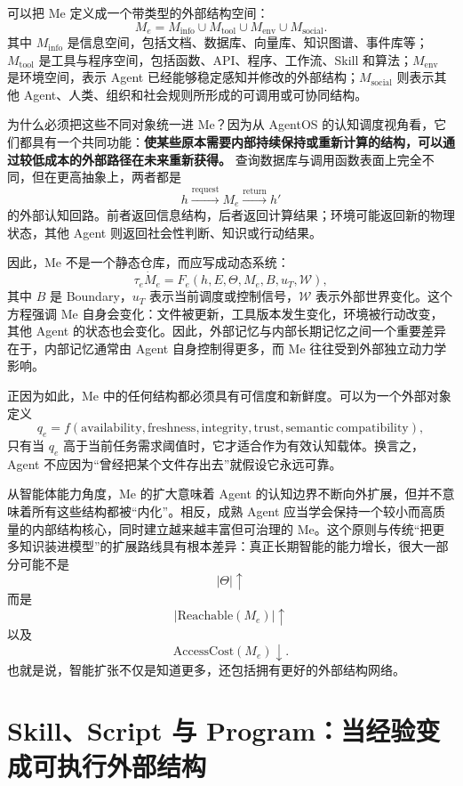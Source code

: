 可以把 Me 定义成一个带类型的外部结构空间：
\[
M_e
=
M_{\mathrm{info}}
\cup
M_{\mathrm{tool}}
\cup
M_{\mathrm{env}}
\cup
M_{\mathrm{social}}.
\]
其中 \(M_{\mathrm{info}}\) 是信息空间，包括文档、数据库、向量库、知识图谱、事件库等；\(M_{\mathrm{tool}}\) 是工具与程序空间，包括函数、API、程序、工作流、Skill 和算法；\(M_{\mathrm{env}}\) 是环境空间，表示 Agent 已经能够稳定感知并修改的外部结构；\(M_{\mathrm{social}}\) 则表示其他 Agent、人类、组织和社会规则所形成的可调用或可协同结构。

为什么必须把这些不同对象统一进 Me？因为从 AgentOS 的认知调度视角看，它们都具有一个共同功能：\textbf{使某些原本需要内部持续保持或重新计算的结构，可以通过较低成本的外部路径在未来重新获得。} 查询数据库与调用函数表面上完全不同，但在更高抽象上，两者都是
\[
h
\xrightarrow{\mathrm{request}}
M_e
\xrightarrow{\mathrm{return}}
h'
\]
的外部认知回路。前者返回信息结构，后者返回计算结果；环境可能返回新的物理状态，其他 Agent 则返回社会性判断、知识或行动结果。

因此，Me 不是一个静态仓库，而应写成动态系统：
\[
\tau_e\dot M_e
=
F_e(h,E,\Theta,M_e,B,u_T,\mathcal W),
\]
其中 \(B\) 是 Boundary，\(u_T\) 表示当前调度或控制信号，\(\mathcal W\) 表示外部世界变化。这个方程强调 Me 自身会变化：文件被更新，工具版本发生变化，环境被行动改变，其他 Agent 的状态也会变化。因此，外部记忆与内部长期记忆之间一个重要差异在于，内部记忆通常由 Agent 自身控制得更多，而 Me 往往受到外部独立动力学影响。

正因为如此，Me 中的任何结构都必须具有可信度和新鲜度。可以为一个外部对象定义
\[
q_e
=
f(
\mathrm{availability},
\mathrm{freshness},
\mathrm{integrity},
\mathrm{trust},
\mathrm{semantic\ compatibility}
),
\]
只有当 \(q_e\) 高于当前任务需求阈值时，它才适合作为有效认知载体。换言之，Agent 不应因为``曾经把某个文件存出去''就假设它永远可靠。

从智能体能力角度，Me 的扩大意味着 Agent 的认知边界不断向外扩展，但并不意味着所有这些结构都被``内化''。相反，成熟 Agent 应当学会保持一个较小而高质量的内部结构核心，同时建立越来越丰富但可治理的 Me。这个原则与传统``把更多知识装进模型''的扩展路线具有根本差异：真正长期智能的能力增长，很大一部分可能不是
\[
|\Theta|\uparrow
\]
而是
\[
|\mathrm{Reachable}(M_e)|\uparrow
\]
以及
\[
\mathrm{AccessCost}(M_e)\downarrow.
\]
也就是说，智能扩张不仅是知道更多，还包括拥有更好的外部结构网络。

\section{Skill、Script 与 Program：当经验变成可执行外部结构}


